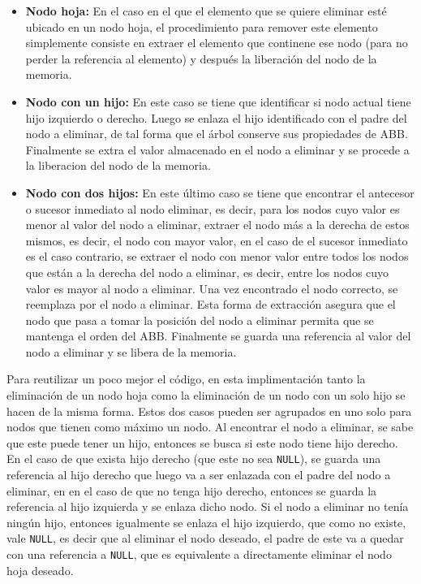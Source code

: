 \documentclass[titlepage,a4paper]{article}
\begin{document}
\begin{itemize}
	\item \textbf{Nodo hoja:} En el caso en el que el elemento que
			se quiere eliminar esté ubicado en un nodo hoja, el procedimiento para
			remover este elemento simplemente consiste en extraer el elemento que
			continene ese nodo (para no perder la referencia al elemento) y después
			la liberación del nodo de la memoria.
		\item \textbf{Nodo con un hijo:} En este caso se tiene que identificar si
			nodo actual tiene hijo izquierdo o derecho. Luego se enlaza el hijo
			identificado con el padre del nodo a eliminar, de tal forma que el árbol
			conserve sus propiedades de ABB. Finalmente se extra el valor almacenado
			en el nodo a eliminar y se procede a la liberacion del nodo de la memoria.
		\item \textbf{Nodo con dos hijos:} En este último caso se tiene que
			encontrar el antecesor o sucesor inmediato al nodo eliminar, es decir,
			para los nodos cuyo valor es menor al valor del nodo a eliminar, extraer
			el nodo más a la derecha de estos mismos, es decir, el nodo con mayor
			valor, en el caso de el sucesor inmediato es el caso contrario, se
			extraer el nodo con menor valor entre todos los nodos que están a la
			derecha del nodo a eliminar, es decir, entre los nodos cuyo valor es mayor
			al nodo a eliminar. Una vez encontrado el nodo correcto, se reemplaza
			por el nodo a eliminar. Esta forma de extracción asegura que el nodo que
			pasa a tomar la posición del nodo a eliminar permita que se mantenga el
			orden del ABB. Finalmente se guarda una referencia al valor del nodo a
			eliminar y se libera de la memoria.
\end{itemize}

Para reutilizar un poco mejor el código, en esta implimentación tanto la
eliminación de un nodo hoja como la eliminación de un nodo con un solo hijo se
hacen de la misma forma. Estos dos casos pueden ser agrupados en uno solo para
nodos que tienen como máximo un nodo. Al encontrar el nodo a eliminar, se sabe
que este puede tener un hijo, entonces se busca si este nodo tiene hijo derecho.
En el caso de que exista hijo derecho (que este no sea \lstinline{NULL}), se
guarda una referencia al hijo derecho que luego va a ser enlazada con el padre
del nodo a eliminar, en en el caso de que no tenga hijo derecho, entonces se 
guarda la referencia al hijo izquierda y se enlaza dicho nodo. Si el nodo a
eliminar no tenía ningún hijo, entonces igualmente se enlaza el hijo izquierdo,
que como no existe, vale \lstinline{NULL}, es decir que al eliminar el nodo
deseado, el padre de este va a quedar con una referencia a \lstinline{NULL},
que es equivalente a directamente eliminar el nodo hoja deseado.
\end{document}
